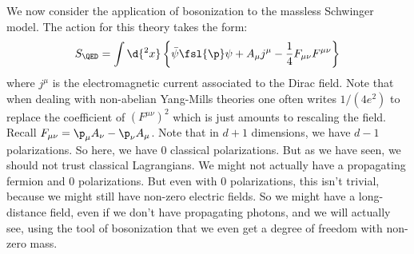 \documentclass{booc}
\begin{document}
We now consider the application of bosonization to the massless
Schwinger model.
The action for this theory takes the form:
\begin{equation}
S_\QED = \int \d{^2 x}
\left\{ 
\bar \psi \fsl{\p} \psi + 
A_\mu j^\mu
- \frac{1}{4}F_{\mu\nu}F^{\mu\nu}
\right\}
\end{equation}
where $j^\mu$ is the electromagnetic current associated to the Dirac field.
Note that when dealing with non-abelian Yang-Mills theories 
one often writes $1 / \left( 4e^2 \right)$ to replace the coefficient of 
$\left( F^{\mu\nu} \right)^2$
which is just amounts to rescaling the field.
Recall $F_{\mu\nu} = \p_\mu A_\nu - \p_\nu A_\mu$.
Note that in $d + 1$ dimensions, we have $d -1$ polarizations. 
So here, we have $0$ classical polarizations. 
But as we have seen, we should not trust classical Lagrangians. 
We might not actually have a propagating fermion and $0$ polarizations. 
But even with $0$ polarizations, this isn't trivial, because we might still have
non-zero electric fields.
So we might have a long-distance field, even if we don't have propagating photons,
and we will actually see, using the tool of bosonization that we even get a degree of freedom
with non-zero mass.
\end{document}
